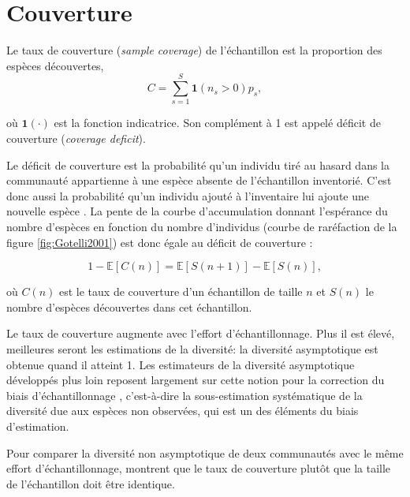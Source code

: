\documentclass[
  11pt,
  american,
  a4paper,
  extrafontsizes,onecolumn,openright
  ]{memoir}
\begin{document}
\hypertarget{sec-Couverture}{%
\section{Couverture}\label{sec-Couverture}}

Le taux de couverture (\emph{sample coverage}) de l'échantillon est la proportion des espèces découvertes,
\begin{equation}
  \label{eq:C}
  C = \sum^S_{s=1}{{\mathbf 1}\left( n_s > 0 \right) p_s},
\end{equation}

où \({\mathbf 1}(\cdot)\) est la fonction indicatrice.
Son complément à 1 est appelé déficit de couverture (\emph{coverage deficit}).

Le déficit de couverture est la probabilité qu'un individu tiré au hasard dans la communauté appartienne à une espèce absente de l'échantillon inventorié.
C'est donc aussi la probabilité qu'un individu ajouté à l'inventaire lui ajoute une nouvelle espèce \autocite{Good1953}.
La pente de la courbe d'accumulation donnant l'espérance du nombre d'espèces en fonction du nombre d'individus (courbe de raréfaction de la figure \ref{fig:Gotelli2001}) est donc égale au déficit de couverture \autocite{Chao2012b}:

\begin{equation}
  \label{eq:DefC}
  1 - {\mathbb E}\left[ C\left( n \right) \right] = {\mathbb E}\left[ S\left( n + 1 \right) \right] - {\mathbb E}\left[ S\left( n \right) \right],
\end{equation}

où \(C(n)\) est le taux de couverture d'un échantillon de taille \(n\) et \(S(n)\) le nombre d'espèces découvertes dans cet échantillon.

Le taux de couverture augmente avec l'effort d'échantillonnage.
Plus il est élevé, meilleures seront les estimations de la diversité: la diversité asymptotique est obtenue quand il atteint 1.
Les estimateurs de la diversité asymptotique développés plus loin reposent largement sur cette notion pour la correction du biais d'échantillonnage \autocite{Dauby2012}, c'est-à-dire la sous-estimation systématique de la diversité due aux espèces non observées, qui est un des éléments du biais d'estimation.

Pour comparer la diversité non asymptotique de deux communautés avec le même effort d'échantillonnage, \textcite{Chao2012b} montrent que le taux de couverture plutôt que la taille de l'échantillon doit être identique.
\end{document}
